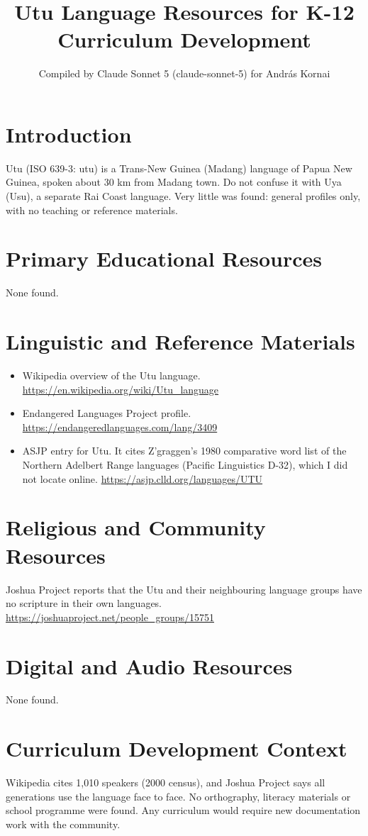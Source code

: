\documentclass[12pt]{article}
\title{Utu Language Resources for K-12 Curriculum Development}
\author{Compiled by Claude Sonnet 5 (claude-sonnet-5) for Andr\'as Kornai}
\date{}
\begin{document}
\maketitle

\section{Introduction}
Utu (ISO 639-3: utu) is a Trans-New Guinea (Madang) language of Papua New Guinea, spoken about 30 km from Madang town. Do not confuse it with Uya (Usu), a separate Rai Coast language. Very little was found: general profiles only, with no teaching or reference materials.

\section{Primary Educational Resources}
None found.

\section{Linguistic and Reference Materials}
\begin{itemize}
\item Wikipedia overview of the Utu language. \url{https://en.wikipedia.org/wiki/Utu_language}
\item Endangered Languages Project profile. \url{https://endangeredlanguages.com/lang/3409}
\item ASJP entry for Utu. It cites Z'graggen's 1980 comparative word list of the Northern Adelbert Range languages (Pacific Linguistics D-32), which I did not locate online. \url{https://asjp.clld.org/languages/UTU}
\end{itemize}

\section{Religious and Community Resources}
Joshua Project reports that the Utu and their neighbouring language groups have no scripture in their own languages. \url{https://joshuaproject.net/people_groups/15751}

\section{Digital and Audio Resources}
None found.

\section{Curriculum Development Context}
Wikipedia cites 1,010 speakers (2000 census), and Joshua Project says all generations use the language face to face. No orthography, literacy materials or school programme were found. Any curriculum would require new documentation work with the community.
\end{document}
